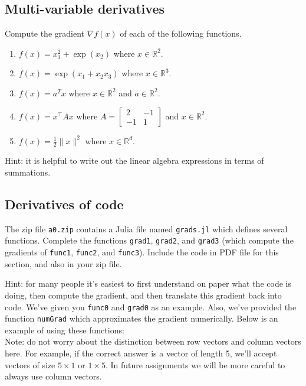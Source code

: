 \documentclass{article}
\def\blu#1{{\color{blu}#1}}
\def\norm#1{\|#1\|}
\def\R{\mathbb{R}}
\newcommand{\fig}[2]{\texttt{[image: a0f/\#2]}}
\begin{document}
\subsection{Multi-variable derivatives}

\blu{Compute the gradient $\nabla f(x)$ of each of the following functions.}
\begin{enumerate}
\item $f(x) = x_1^2 + \exp(x_2)$ where $x \in \R^2$.
\item $f(x) = \exp(x_1 + x_2x_3)$ where $x \in \mathbb{R}^3$.
\item $f(x) = a^Tx$ where $x \in \R^2$ and $a \in \R^2$.
\item $f(x) = x^\top A x$ where $A=\left[ \begin{array}{cc}
2 & -1 \\
 -1 & 1 \end{array} \right]$ and $x \in \mathbb{R}^2$.
 \item $f(x) = \frac{1}{2}\norm{x}^2$ where $x \in \R^d$.
\end{enumerate}

Hint: it is helpful to write out the linear algebra expressions in terms of summations.



\subsection{Derivatives of code}

The zip file \texttt{a0.zip} contains a Julia file named \texttt{grads.jl} which defines several functions. \blu{Complete the functions \texttt{grad1}, \texttt{grad2}, and \texttt{grad3} (which compute the gradients of \texttt{func1}, \texttt{func2}, and \texttt{func3})}. Include the code in PDF file for this section, and also in your zip file.

Hint: for many people it's easiest to first understand on paper what the code is doing, then compute
the gradient, and then translate this gradient back into code. We've given you \texttt{func0} and \texttt{grad0} as an example. Also, we've provided the function \texttt{numGrad} which approximates the gradient numerically. Below is an example of using these functions:\\

Note: do not worry about the distinction between row vectors and column vectors here.
For example, if the correct answer is a vector of length 5, we'll accept vectors of size $5 \times 1$ or $1 \times 5$. In future assignments we will be more careful to always use column vectors.
\end{document}
